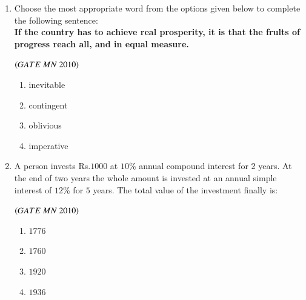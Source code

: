 \documentclass{article}
\begin{document}
\begin{enumerate}[label=Q.\arabic*., itemsep=1em, leftmargin=0pt, itemindent=*, labelsep=0.5em]
\begin{enumerate}[label=Q.\arabic*., start=17, leftmargin=2em]
\begin{enumerate}[label=Q.\arabic*., start=33, leftmargin=2em]
\begin{enumerate}[label=(\Alph*),leftmargin=4em]
\end{enumerate}
\bigskip
\item Choose the most appropriate word from the options given below to complete the following
sentence:\\
\textbf{If the country has to achieve real prosperity, it is \underline{\hspace{1.5cm}} that the frults of progress reach all, and in equal measure.}
\\
\begin{flushright}
\hfill$\left(GATE\ MN\ 2010\right)$
\end{flushright}
\begin{enumerate}[label=(\Alph*),leftmargin=4em]
\item inevitable
\item contingent
\item oblivious
\item imperative
\end{enumerate}
\bigskip
\item A person invests Rs.$1000$ at $10$\% annual compound interest for 2 years. At the end of two years the
whole amount is invested at an annual simple interest of $12$\% for $5$ years. The total value of the
investment finally is:
\\
\begin{flushright}
\hfill$\left(GATE\ MN\ 2010\right)$
\end{flushright}
\begin{multicols}{4}
\begin{enumerate}[label=(\Alph*),leftmargin=4em]
\item $1776$
\item $1760$
\item $1920$
\item $1936$
\end{enumerate}
\end{multicols}

\bigskip

\end{enumerate}
\end{enumerate}
\end{enumerate}
\end{document}
